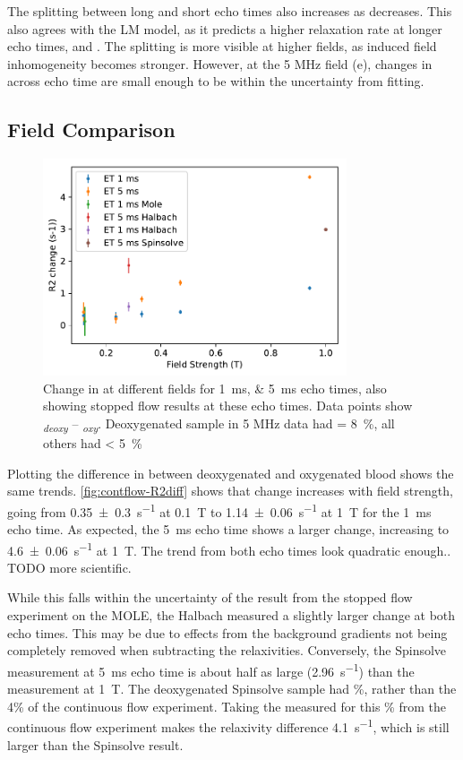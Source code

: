 The splitting between long and short echo times also increases as \SOtwo decreases.
This also agrees with the LM model, as it predicts a higher relaxation rate at longer echo times, and .
The splitting is more visible at higher fields, as induced field inhomogeneity becomes stronger.
However, at the 5 MHz field (e), changes in \Rtwo across echo time are small enough to be within the uncertainty from fitting.

\subsection{Field Comparison}
\begin{figure}[ht]
\centering
\includegraphics[width=0.8\textwidth]{figures/contflow/R2fieldDep.pdf}
\caption[Change in \Rtwo at different fields]{Change in \Rtwo at different fields for \SIlist{1;5}{ms} echo times, also showing stopped flow results at these echo times. Data points show \Rtwo\textsubscript{\textit{deoxy}} -- \Rtwo\textsubscript{\textit{oxy}}. Deoxygenated sample in 5 MHz data had \SOtwo = \SI{8}{\percent}, all others had \SOtwo < \SI{5}{\percent}}
\label{fig:contflow-R2diff}
\end{figure}

Plotting the difference in \Rtwo between deoxygenated and oxygenated blood shows the same trends.
\autoref{fig:contflow-R2diff} shows that \Rtwo change increases with field strength, going from \SI{0.35\pm0.3}{s^{-1}} at \SI{0.1}{T} to \SI{1.14\pm0.06}{s^{-1}} at \SI{1}{T} for the \SI{1}{ms} echo time.
As expected, the \SI{5}{ms} echo time shows a larger \Rtwo change, increasing to \SI{4.6\pm0.06}{s^{-1}} at \SI{1}{T}.
The trend from both echo times look quadratic enough.. TODO more scientific.

While this falls within the uncertainty of the result from the stopped flow experiment on the MOLE, the Halbach measured a slightly larger \Rtwo change at both echo times.
This may be due to effects from the background gradients not being completely removed when subtracting the relaxivities.
Conversely, the Spinsolve measurement at \SI{5}{ms} echo time is about half as large (\SI{2.96}{s^{-1}}) than the measurement at \SI{1}{T}.
The deoxygenated Spinsolve sample had \%, rather than the 4\% of the continuous flow experiment.
Taking the measured \Rtwo for this \%  from the continuous flow experiment makes the relaxivity difference \SI{4.1}{s^{-1}}, which is still larger than the Spinsolve result.

